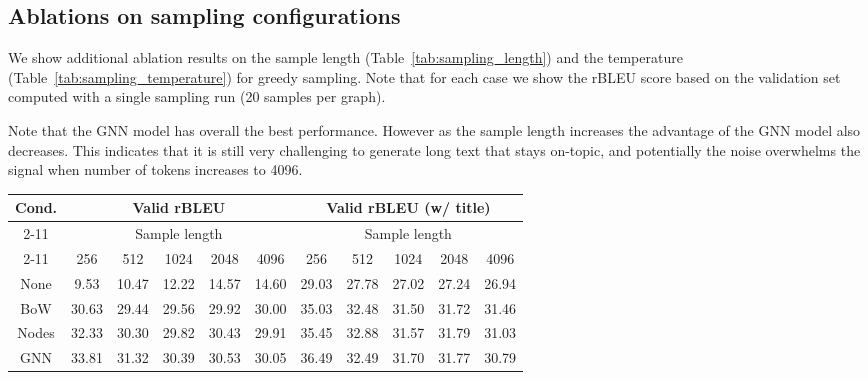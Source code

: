 \documentclass[11pt]{article}
\begin{document}
\subsection{Ablations on sampling configurations}
\label{sec:appendix_sampling}
We show additional ablation results on the sample length (Table~\ref{tab:sampling_length}) and the temperature  (Table~\ref{tab:sampling_temperature}) for greedy sampling. Note that for each case we show the rBLEU score based on the validation set computed with a single sampling run (20 samples per graph).

Note that the GNN model has overall the best performance.  However as the sample length increases the advantage of the GNN model also decreases.  This indicates that it is still very challenging to generate long text that stays on-topic, and potentially the noise overwhelms the signal when number of tokens increases to 4096.

\begin{table*}[h]
    \centering
    \begin{tabular}{c|c|c|c|c|c|c|c|c|c|c}
    \hline
        \multirow{3}{*}{Cond.} & \multicolumn{5}{c|}{Valid rBLEU} & \multicolumn{5}{c}{Valid rBLEU (w/ title)} \\ \cline{2-11}
        & \multicolumn{5}{c|}{Sample length} & \multicolumn{5}{c}{Sample length} \\ \cline{2-11}
         & 256 & 512 & 1024 & 2048 & 4096 & 256 & 512 & 1024 & 2048 & 4096 \\
        \hline
        None & 9.53 & 10.47 & 12.22 & 14.57 & 14.60 & 29.03 & 27.78 & 27.02 & 27.24 & 26.94  \\
        BoW & 30.63 & 29.44 & 29.56 & 29.92 & 30.00 & 35.03 & 32.48 & 31.50 & 31.72 & 31.46 \\
        Nodes & 32.33 & 30.30 & 29.82 & 30.43 & 29.91 & 35.45 & 32.88 & 31.57 & 31.79 & 31.03 \\
        GNN & 33.81 & 31.32 & 30.39 & 30.53 & 30.05 & 36.49 & 32.49 & 31.70 & 31.77 & 30.79 \\
    \hline
    \end{tabular}
    \caption{Generated samples vs sample length.
}
    \label{tab:sampling_length}
\end{table*}
\end{document}
